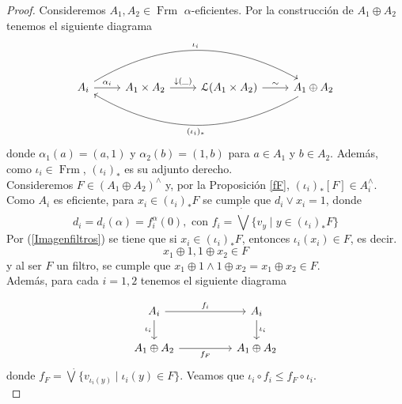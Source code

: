 \documentclass[11pt]{amsart}
\DeclareMathOperator{\Frm}{Frm}
\theoremstyle{plain}
\theoremstyle{definition}
\begin{document}
\begin{proof}
Consideremos $A_1, A_2\in \Frm$ $\alpha$-eficientes. Por la construcción de $A_1\oplus A_2$ tenemos el siguiente diagrama
\[
\begin{tikzcd}
A_i \arrow[r, "\alpha_i"] \arrow[rrr, "\iota_i", bend left] & A_1\times A_2  \arrow[r, "\downarrow(\_)"] & \mathcal{L}(A_1\times A_2) \arrow[r, "\sim"] & A_1\oplus A_2 \arrow[lll, "(\iota_i)_*", bend left]
\end{tikzcd}
\]
donde $\alpha_1(a)=(a, 1)$ y $\alpha_2(b)=(1, b)$ para $a\in A_1$ y $b\in A_2$. Además, como $\iota_i\in \Frm$, $(\iota_i)_*$ es su adjunto derecho.\\

Consideremos $F\in (A_1\oplus A_2)^\wedge$ y, por la Proposición \ref{fF}, $(\iota_i)_*[F]\in A_i^\wedge$. Como $A_i$ es eficiente, para $x_i\in (\iota_i)_*F$ se cumple que $d_i\vee x_i=1$, donde 
\[
d_i=d_i(\alpha)=f_i^\alpha(0), \mbox{ con } f_i=\dot{\bigvee}\{v_y\mid y\in (\iota_i)_*F\}
\]
Por (\ref{Imagenfiltros}) se tiene que si $x_i\in (\iota_i)_*F$, entonces $\iota_i(x_i)\in F$, es decir.
\[
x_1\oplus 1, 1\oplus x_2\in F
\]
y al ser $F$ un filtro, se cumple que $x_1\oplus 1\wedge 1\oplus x_2=x_1\oplus x_2\in F$.\\

Además, para cada $i=1, 2$ tenemos el siguiente diagrama

\[\begin{tikzcd}
	{A_i} && {A_i} \\
	{A_1\oplus A_2} && {A_1\oplus A_2}
	\arrow["{f_i}", from=1-1, to=1-3]
	\arrow["{\iota_i}"', from=1-1, to=2-1]
	\arrow["{\iota_i}", from=1-3, to=2-3]
	\arrow["f_F"', from=2-1, to=2-3]
\end{tikzcd}\]
donde $f_F=\dot{\bigvee}\{v_{\iota_i(y)}\mid \iota_i(y)\in F\}$. Veamos que $\iota_i\circ f_i\leq f_F\circ \iota_i$.\\
    

\end{proof}
\end{document}
